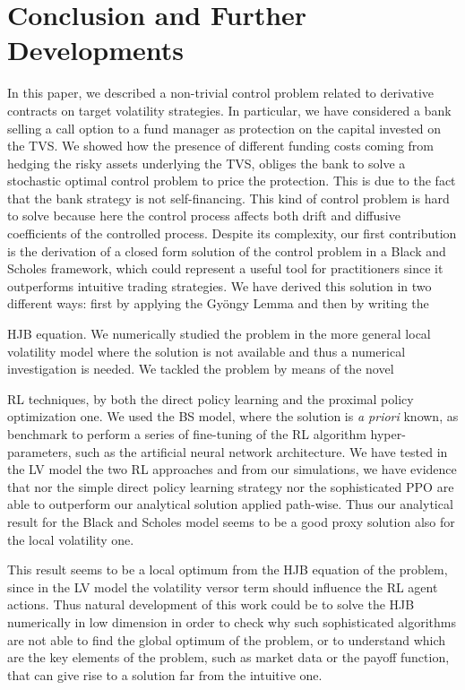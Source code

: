 \documentclass[runningheads]{m2ef}
\newcommand\soutpars[1]{\let\helpcmd\sout\parhelp#1\par\relax\relax}
\newcommand{\change}[1]{{\color{red} {#1}}}%
\newcommand{\remove}[1]{{\color{red} \soutpars{{#1}}}}%
\begin{document}
\section{Conclusion and \change{F}urther \change{D}evelopments}
In this paper, we described a non-trivial control problem related to derivative contracts on target volatility strategies. In particular, we have considered a bank selling a call option to a fund manager as protection on the capital invested on the TVS. We showed how the presence of different funding costs coming from hedging the risky assets underlying the TVS, obliges the bank to solve a stochastic optimal control problem to price the protection. This is due to the fact that the bank strategy is not self-financing. This kind of control problem is hard to solve because here the control process affects both drift and diffusive coefficients of the controlled process. Despite its complexity, our first contribution is the derivation of a closed form solution of the control problem in a Black and Scholes framework, which could represent a useful tool for practitioners since it outperforms intuitive trading strategies. We have derived this solution in two different ways: first by applying the Gy\"ongy  Lemma and then by writing the \remove{Hamilton-Jacobi-Bellman} \change{HJB} equation.  We numerically studied the problem in the more general local volatility model where the solution is not available and thus a numerical investigation is needed. We tackled the problem by means of the novel \remove{Reinforcement Learning} \change{RL} techniques, by both the direct policy learning and the proximal policy optimization one. We used the BS model, where the solution is \textit{a priori} known, as benchmark to perform a series of fine-tuning of the RL algorithm hyper-parameters, such as the artificial neural network architecture. We have tested in the LV model the two RL approaches and from our simulations, we have evidence that nor the simple direct policy learning strategy nor the sophisticated PPO are able to outperform our analytical solution applied path-wise. Thus our analytical result for the Black and Scholes model seems to be a good proxy solution also for the local volatility one.

 This result seems to be a local optimum from the HJB equation of the problem, since in the LV model the volatility versor term should influence the RL agent actions. Thus natural development of this work could be to solve the HJB numerically in low dimension in order to check why such sophisticated algorithms are not able to find the global optimum of the problem, or to understand which are the key elements of the problem, such as market data or the payoff function, that can give rise to a solution far from the intuitive one. 
\end{document}
